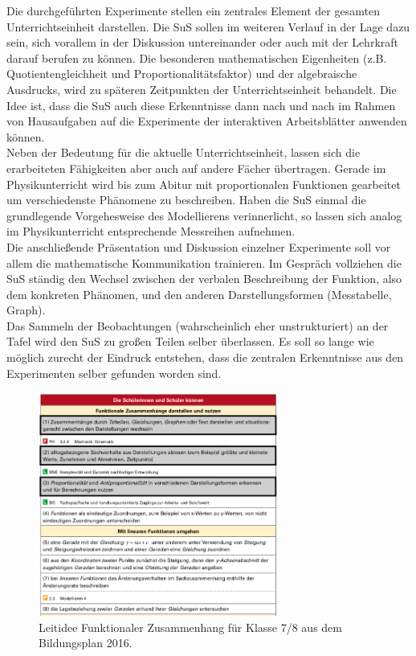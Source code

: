 \documentclass[../main.tex]{subfiles}
\begin{document}
Die durchgeführten Experimente stellen ein zentrales Element der gesamten Unterrichtseinheit darstellen. Die SuS sollen im weiteren Verlauf in der Lage dazu sein, sich vorallem in der Diskussion untereinander oder auch mit der Lehrkraft darauf berufen zu können. Die besonderen mathematischen Eigenheiten (z.B. Quotientengleichheit und Proportionalitätsfaktor) und der algebraische Ausdrucks, wird zu späteren Zeitpunkten der Unterrichtseinheit behandelt. Die Idee ist, dass die SuS auch diese Erkenntnisse dann nach und nach im Rahmen von Hausaufgaben auf die Experimente der interaktiven Arbeitsblätter anwenden können.\\
Neben der Bedeutung für die aktuelle Unterrichtseinheit, lassen sich die erarbeiteten Fähigkeiten aber auch auf andere Fächer übertragen. Gerade im Physikunterricht wird bis zum Abitur mit proportionalen Funktionen gearbeitet um verschiedenste Phänomene zu beschreiben. Haben die SuS einmal die grundlegende Vorgehesweise des Modellierens verinnerlicht, so lassen sich analog im Physikunterricht entsprechende Messreihen aufnehmen.\\
Die anschließende Präsentation und Diskussion einzelner Experimente soll vor allem die mathematische Kommunikation trainieren. Im Gespräch vollziehen die SuS ständig den Wechsel zwischen der verbalen Beschreibung der Funktion, also dem konkreten Phänomen, und den anderen Darstellungsformen (Messtabelle, Graph).\\
Das Sammeln der Beobachtungen (wahrscheinlich eher unstrukturiert) an der Tafel wird den SuS zu großen Teilen selber überlassen. Es soll so lange wie möglich zurecht der Eindruck entstehen, dass die zentralen Erkenntnisse aus den Experimenten selber gefunden worden sind. 

\begin{figure}[htpb]
    \centering
    \includegraphics[width=0.7\textwidth]{img/bildungsplan2.png}
    \caption{Leitidee Funktionaler Zusammenhang für Klasse 7/8 aus dem Bildungsplan 2016.}
    \label{fig:bildungsplan} 
\end{figure}
\end{document}
